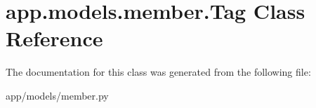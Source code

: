 \hypertarget{classapp_1_1models_1_1member_1_1_tag}{}\section{app.\+models.\+member.\+Tag Class Reference}
\label{classapp_1_1models_1_1member_1_1_tag}


The documentation for this class was generated from the following file\+:\begin{DoxyCompactItemize}
\item 
app/models/member.\+py\end{DoxyCompactItemize}
